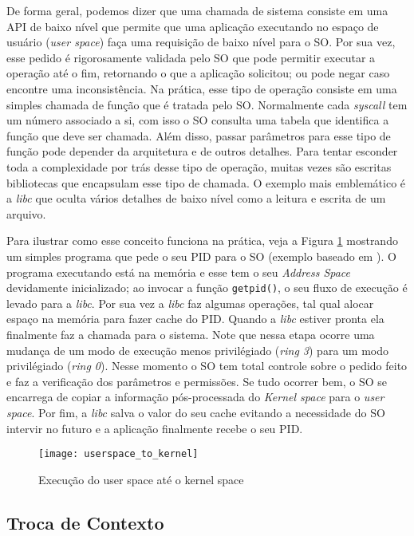 De forma geral, podemos dizer que uma chamada de sistema consiste em uma API de
baixo nível que permite que uma aplicação executando no espaço de usuário
(\emph{user space}) faça uma requisição de baixo nível para o SO. Por sua vez,
esse pedido é rigorosamente validada pelo SO que pode permitir executar a
operação até o fim, retornando o que a aplicação solicitou; ou pode negar caso
encontre uma inconsistência. Na prática, esse tipo de operação consiste em uma
simples chamada de função que é tratada pelo SO. Normalmente cada
\emph{syscall} tem um número associado a si, com isso o SO consulta uma tabela
que identifica a função que deve ser chamada. Além disso, passar parâmetros
para esse tipo de função pode depender da arquitetura e de outros detalhes.
Para tentar esconder toda a complexidade por trás desse tipo de operação,
muitas vezes são escritas bibliotecas que encapsulam esse tipo de chamada. O
exemplo mais emblemático é a \emph{libc} que oculta vários detalhes de baixo
nível como a leitura e escrita de um arquivo.

Para ilustrar como esse conceito funciona na prática, veja a Figura
\ref{fig:userspace_kernelspace} mostrando um simples programa que pede o seu
PID para o SO (exemplo baseado em \cite{syscallex}). O programa executando está
na memória e esse tem o seu \emph{Address Space} devidamente inicializado; ao
invocar a função \texttt{getpid()}, o seu fluxo de execução é levado para a
\emph{libc}. Por sua vez a \emph{libc} faz algumas operações, tal qual alocar
espaço na memória para fazer cache do PID. Quando a \emph{libc} estiver pronta
ela finalmente faz a chamada para o sistema. Note que nessa etapa ocorre uma
mudança de um modo de execução menos privilégiado (\emph{ring 3}) para um modo
privilégiado (\emph{ring 0}). Nesse momento o SO tem total controle sobre o
pedido feito e faz a verificação dos parâmetros e permissões. Se tudo ocorrer
bem, o SO se encarrega de copiar a informação pós-processada do \emph{Kernel
space} para o \emph{user space}. Por fim, a \emph{libc} salva o valor do seu
cache evitando a necessidade do SO intervir no futuro e a aplicação finalmente
recebe o seu PID.

\begin{figure}[!h]
  \centering
  \texttt{[image: userspace\_to\_kernel]} 
  \caption{Execução do user space até o kernel space}
  \label{fig:userspace_kernelspace}
\end{figure}

\subsection{Troca de Contexto}

